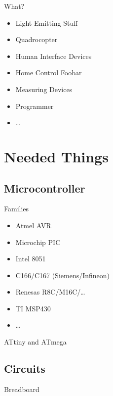 \documentclass{beamer}
\begin{document}
\begin{frame}{What?}
    \begin{itemize}
        \item Light Emitting Stuff
        \item Quadrocopter
        \item Human Interface Devices
        \item Home Control Foobar
        \item Measuring Devices
        \item Programmer
        \item \dots
    \end{itemize}
\end{frame}

\section{Needed Things}

\subsection{Microcontroller}

\begin{frame}{Families}
    \begin{itemize}
        \item Atmel AVR
        \item Microchip PIC
        \item Intel 8051
        \item C166/C167 (Siemens/Infineon)
        \item Renesas R8C/M16C/…
        \item TI MSP430
        \item …
    \end{itemize}
\end{frame}

\begin{frame}{ATtiny and ATmega}
    \begin{figure}
    \end{figure}
\end{frame}

\subsection{Circuits}

\begin{frame}{Breadboard}
    \begin{figure}
    \end{figure}
\end{frame}
\end{document}

